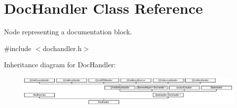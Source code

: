 \hypertarget{class_doc_handler}{}\section{Doc\+Handler Class Reference}
\label{class_doc_handler}


Node representing a documentation block.  




{\ttfamily \#include $<$dochandler.\+h$>$}

Inheritance diagram for Doc\+Handler\+:\begin{figure}[H]
\begin{center}
\leavevmode
\includegraphics[height=1.600000cm]{class_doc_handler}
\end{center}
\end{figure}
